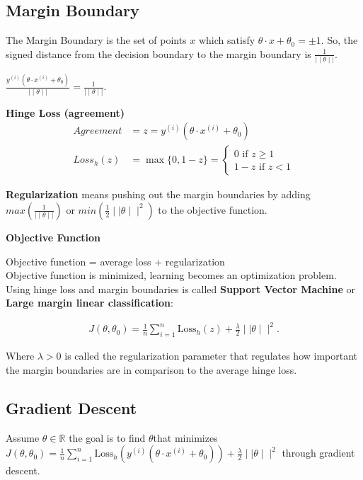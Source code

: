 \subsection{Margin Boundary}

The Margin Boundary is the set of points  $x$  which satisfy $\theta \cdot x + \theta _0= \pm 1$. So, the signed distance from the decision boundary to the margin boundary is $\displaystyle \frac{1}{\mid \mid \theta \mid \mid }$.

$\frac{y^{(i)}(\theta \cdot x^{(i)} + \theta _0)}{\mid \mid \theta \mid \mid }=\frac{1}{\mid \mid \theta \mid \mid }.$

\textbf{Hinge Loss (agreement)}
\begin{align*}
Agreement &= z = y^{(i)}(\theta \cdot x^{(i)} + \theta _0)\\
Loss_h(z) &= \max\lbrace{0, 1-z\rbrace} = 
\begin{cases}
		 0 \text{ if } z \geq 1\\
		 1-z \text{ if } z < 1
\end{cases} 
\end{align*}

\textbf{Regularization} means pushing out the margin boundaries by adding $max(\frac{1}{\mid \mid \theta \mid \mid })$ or $min(\frac{1}{2}\mid \mid \theta \mid \mid^2)$ to the objective function.

\textbf{Objective Function}

Objective function = average loss + regularization\\

Objective function is minimized, learning becomes an optimization problem. Using hinge loss and margin boundaries is called \textbf{Support Vector Machine} or \textbf{Large margin linear classification}:

\begin{align*}
J(\theta , \theta _0) = \frac{1}{n} \sum _{i=1}^{n} \text {Loss}_ h (z) + \frac{\lambda }{2} \mid \mid \theta \mid \mid ^2.
\end{align*}

Where $\lambda > 0$ is called the regularization parameter that regulates how important the margin boundaries are in comparison to the average hinge loss.

\subsection{Gradient Descent}

Assume $\theta \in \mathbb{R}$ the goal is to find $\theta $that minimizes $J(\theta , \theta _0) = \frac{1}{n} \sum _{i=1}^{n} \text {Loss}_ h (y^{(i)} (\theta \cdot x^{(i)} + \theta _0 )) + \frac{\lambda }{2} \mid \mid \theta \mid \mid ^2$ through gradient descent.\\

